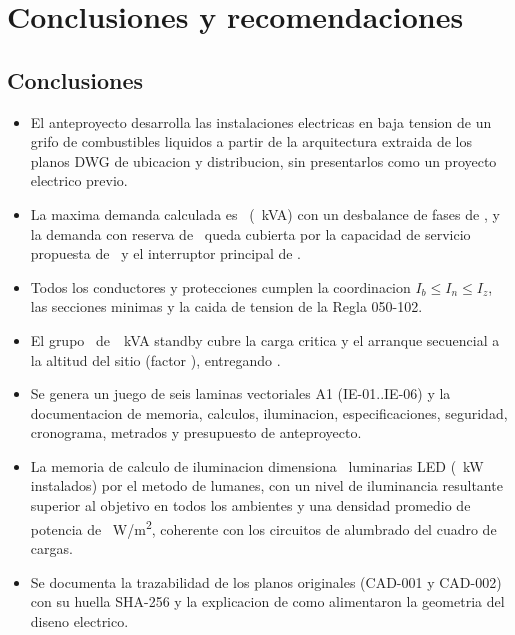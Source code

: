 \chapter{Conclusiones y recomendaciones}

\section{Conclusiones}
\begin{itemize}
\item El anteproyecto desarrolla las instalaciones electricas en baja tension
  de un grifo de combustibles liquidos a partir de la arquitectura extraida de
  los planos DWG de ubicacion y distribucion, sin presentarlos como un
  proyecto electrico previo.
\item La maxima demanda calculada es \MD~(\MDkva~kVA) con un desbalance de
  fases de \Desb, y la demanda con reserva de \MDReserva~queda cubierta por la
  capacidad de servicio propuesta de \ServCap~y el interruptor principal de
  \IPrincipal.
\item Todos los conductores y protecciones cumplen la coordinacion
  \(I_b \leq I_n \leq I_z\), las secciones minimas y la caida de tension de la
  Regla 050-102.
\item El grupo \GrupoModelo~de~\GrupoNom~kVA standby cubre la carga critica y
  el arranque secuencial a la altitud del sitio (factor \AltFactor), entregando
  \GrupoDisp.
\item Se genera un juego de seis laminas vectoriales A1 (IE-01..IE-06) y la
  documentacion de memoria, calculos, iluminacion, especificaciones, seguridad,
  cronograma, metrados y presupuesto de anteproyecto.
\item La memoria de calculo de iluminacion dimensiona \IllumTotalN~luminarias
  LED (\IllumTotalKW~kW instalados) por el metodo de lumanes, con un nivel de
  iluminancia resultante superior al objetivo en todos los ambientes y una
  densidad promedio de potencia de \IllumTotalLPD~W/m\textsuperscript{2},
  coherente con los circuitos de alumbrado del cuadro de cargas.
\item Se documenta la trazabilidad de los planos originales (CAD-001 y CAD-002)
  con su huella SHA-256 y la explicacion de como alimentaron la geometria del
  diseno electrico.
\end{itemize}

